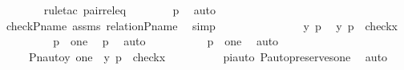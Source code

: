 \begin{isabellebody}
\ \ \ \ \ \ \isamarkupfalse%
\ {\isacharparenleft}{\kern0pt}rule{\isacharunderscore}{\kern0pt}tac\ pair{\isacharunderscore}{\kern0pt}rel{\isacharunderscore}{\kern0pt}eq{\isacharparenright}{\kern0pt}\isanewline
\ \ \ \ \ \ \isamarkupfalse%
\ p{}\ \isamarkupfalse%
\ auto\ \isanewline
\ \ \ \ \ \ \isamarkupfalse%
\ check{\isacharunderscore}{\kern0pt}P{\isacharunderscore}{\kern0pt}name\ assms\ relation{\isacharunderscore}{\kern0pt}P{\isacharunderscore}{\kern0pt}name\ \isamarkupfalse%
\ simp\isanewline
\ \ \ \ \isamarkupfalse%
\ {\isacharminus}{\kern0pt}\ \isanewline
\ \ \ \ \ \ \isamarkupfalse%
\ y\ p\ \isamarkupfalse%
\ {\isachardoublequoteopen}{\isacharless}{\kern0pt}y{\isacharcomma}{\kern0pt}\ p{\isachargreater}{\kern0pt}\ {\isasymin}\ check{\isacharparenleft}{\kern0pt}x{\isacharparenright}{\kern0pt}{\isachardoublequoteclose}\ \isanewline
\ \ \ \ \ \ \isamarkupfalse%
\ \isamarkupfalse%
\ {\isachardoublequoteopen}p\ {\isacharequal}{\kern0pt}\ one{\isachardoublequoteclose}\ \isamarkupfalse%
\ p{}\ \isamarkupfalse%
\ auto\ \isanewline
\ \ \ \ \ \ \isamarkupfalse%
\ \isamarkupfalse%
\ {\isachardoublequoteopen}{\isasympi}{\isacharbackquote}{\kern0pt}p\ {\isacharequal}{\kern0pt}\ {\isasympi}{\isacharbackquote}{\kern0pt}one{\isachardoublequoteclose}\ \isamarkupfalse%
\ auto\ \isanewline
\ \ \ \ \isamarkupfalse%
\ \isanewline
\ \ \ \ \isamarkupfalse%
\ \isamarkupfalse%
\ {\isachardoublequoteopen}{\isachardot}{\kern0pt}{\isachardot}{\kern0pt}{\isachardot}{\kern0pt}\ {\isacharequal}{\kern0pt}\ \ {\isacharbraceleft}{\kern0pt}\ {\isacharless}{\kern0pt}Pn{\isacharunderscore}{\kern0pt}auto{\isacharparenleft}{\kern0pt}{\isasympi}{\isacharparenright}{\kern0pt}{\isacharbackquote}{\kern0pt}y{\isacharcomma}{\kern0pt}\ one{\isachargreater}{\kern0pt}\ {\isachardot}{\kern0pt}\ {\isacharless}{\kern0pt}y{\isacharcomma}{\kern0pt}\ p{\isachargreater}{\kern0pt}\ {\isasymin}\ check{\isacharparenleft}{\kern0pt}x{\isacharparenright}{\kern0pt}\ {\isacharbraceright}{\kern0pt}{\isachardoublequoteclose}\ \isanewline
\ \ \ \ \ \ \isamarkupfalse%
\ piauto\ P{\isacharunderscore}{\kern0pt}auto{\isacharunderscore}{\kern0pt}preserves{\isacharunderscore}{\kern0pt}one\ \isamarkupfalse%
\ auto\ \isanewline
\ \ \ \ \isamarkupfalse%

\end{isabellebody}
